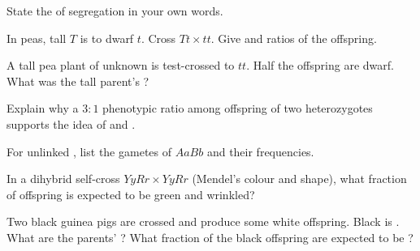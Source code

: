 \begin{exercise}[$\star$]\label{exo:g11:mendelian-genetics:3}
State the  of segregation in your own words.
\end{exercise}

\begin{exercise}[$\star\star$]\label{exo:g11:mendelian-genetics:4}
In peas, tall $T$ is  to dwarf $t$. Cross $Tt \times tt$. Give 
and  ratios of the offspring.
\end{exercise}

\begin{exercise}[$\star\star$]\label{exo:g11:mendelian-genetics:5}
A tall pea plant of unknown  is test-crossed to $tt$. Half the offspring
are dwarf. What was the tall parent's ?
\end{exercise}

\begin{exercise}[$\star\star$]\label{exo:g11:mendelian-genetics:6}
Explain why a $3:1$ phenotypic ratio among offspring of two heterozygotes
supports the idea of  and .
\end{exercise}

\begin{exercise}[$\star\star$]\label{exo:g11:mendelian-genetics:7}
For unlinked , list the gametes of $AaBb$ and their frequencies.
\end{exercise}

\begin{exercise}[$\star\star$]\label{exo:g11:mendelian-genetics:8}
In a dihybrid self-cross $YyRr \times YyRr$ (Mendel's colour and shape), what
fraction of offspring is expected to be green and wrinkled?
\end{exercise}

\begin{exercise}[$\star\star\star$]\label{exo:g11:mendelian-genetics:9}
Two black guinea pigs are crossed and produce some white offspring. Black is
. What are the parents' ? What fraction of the black offspring
are expected to be ?
\end{exercise}

